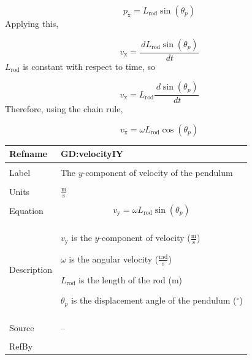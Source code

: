\documentclass[12pt]{article}
\begin{document}
\begin{displaymath}
{p_{\text{x}}}={L_{\text{rod}}} \sin\left({θ_{p}}\right)
\end{displaymath}
Applying this,

\begin{displaymath}
{v_{\text{x}}}=\frac{\,d{L_{\text{rod}}} \sin\left({θ_{p}}\right)}{\,dt}
\end{displaymath}
${L_{\text{rod}}}$ is constant with respect to time, so

\begin{displaymath}
{v_{\text{x}}}={L_{\text{rod}}} \frac{\,d\sin\left({θ_{p}}\right)}{\,dt}
\end{displaymath}
Therefore, using the chain rule,

\begin{displaymath}
{v_{\text{x}}}=ω {L_{\text{rod}}} \cos\left({θ_{p}}\right)
\end{displaymath}
\vspace{\baselineskip}
\noindent
\begin{minipage}{\textwidth}
\begin{tabular}{>{\raggedright}p{}>{\raggedright\arraybackslash}p{}}
\toprule \textbf{Refname} & \textbf{GD:velocityIY}
\label{GD:velocityIY}
\\ \midrule \\
Label & The $y$-component of velocity of the pendulum
        
\\ \midrule \\
Units & $\frac{\text{m}}{\text{s}}$
        
\\ \midrule \\
Equation & \begin{displaymath}
           {v_{\text{y}}}=ω {L_{\text{rod}}} \sin\left({θ_{p}}\right)
           \end{displaymath}
\\ \midrule \\
Description & \begin{symbDescription}
              \item{${v_{\text{y}}}$ is the $y$-component of velocity ($\frac{\text{m}}{\text{s}}$)}
              \item{$ω$ is the angular velocity ($\frac{\text{rad}}{\text{s}}$)}
              \item{${L_{\text{rod}}}$ is the length of the rod (${\text{m}}$)}
              \item{${θ_{p}}$ is the displacement angle of the pendulum (${{}^{\circ}}$)}
              \end{symbDescription}
\\ \midrule \\
Source & --
         
\\ \midrule \\
RefBy & 
\\ \bottomrule
\end{tabular}
\end{minipage}
\end{document}

